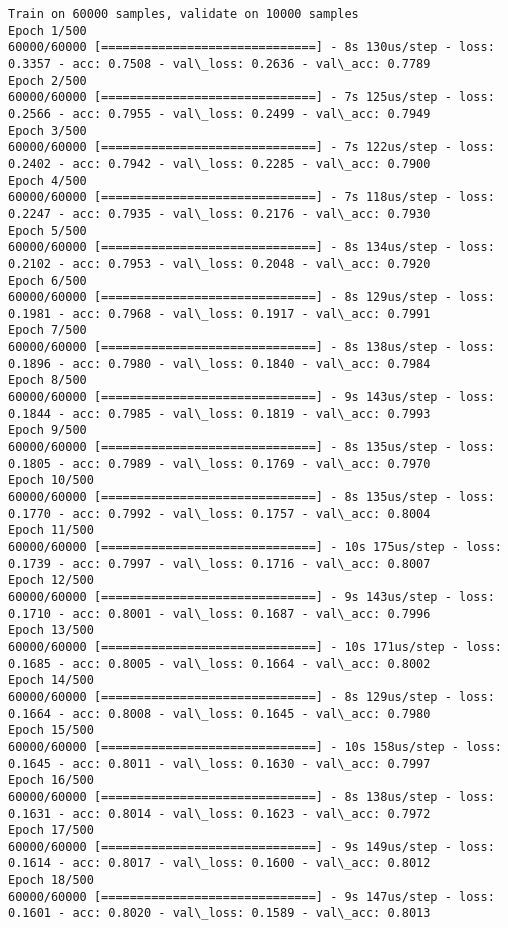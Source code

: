 \documentclass[11pt]{article}
\begin{document}
    \begin{Verbatim}[commandchars=\\\{\}]
Train on 60000 samples, validate on 10000 samples
Epoch 1/500
60000/60000 [==============================] - 8s 130us/step - loss: 0.3357 - acc: 0.7508 - val\_loss: 0.2636 - val\_acc: 0.7789
Epoch 2/500
60000/60000 [==============================] - 7s 125us/step - loss: 0.2566 - acc: 0.7955 - val\_loss: 0.2499 - val\_acc: 0.7949
Epoch 3/500
60000/60000 [==============================] - 7s 122us/step - loss: 0.2402 - acc: 0.7942 - val\_loss: 0.2285 - val\_acc: 0.7900
Epoch 4/500
60000/60000 [==============================] - 7s 118us/step - loss: 0.2247 - acc: 0.7935 - val\_loss: 0.2176 - val\_acc: 0.7930
Epoch 5/500
60000/60000 [==============================] - 8s 134us/step - loss: 0.2102 - acc: 0.7953 - val\_loss: 0.2048 - val\_acc: 0.7920
Epoch 6/500
60000/60000 [==============================] - 8s 129us/step - loss: 0.1981 - acc: 0.7968 - val\_loss: 0.1917 - val\_acc: 0.7991
Epoch 7/500
60000/60000 [==============================] - 8s 138us/step - loss: 0.1896 - acc: 0.7980 - val\_loss: 0.1840 - val\_acc: 0.7984
Epoch 8/500
60000/60000 [==============================] - 9s 143us/step - loss: 0.1844 - acc: 0.7985 - val\_loss: 0.1819 - val\_acc: 0.7993
Epoch 9/500
60000/60000 [==============================] - 8s 135us/step - loss: 0.1805 - acc: 0.7989 - val\_loss: 0.1769 - val\_acc: 0.7970
Epoch 10/500
60000/60000 [==============================] - 8s 135us/step - loss: 0.1770 - acc: 0.7992 - val\_loss: 0.1757 - val\_acc: 0.8004
Epoch 11/500
60000/60000 [==============================] - 10s 175us/step - loss: 0.1739 - acc: 0.7997 - val\_loss: 0.1716 - val\_acc: 0.8007
Epoch 12/500
60000/60000 [==============================] - 9s 143us/step - loss: 0.1710 - acc: 0.8001 - val\_loss: 0.1687 - val\_acc: 0.7996
Epoch 13/500
60000/60000 [==============================] - 10s 171us/step - loss: 0.1685 - acc: 0.8005 - val\_loss: 0.1664 - val\_acc: 0.8002
Epoch 14/500
60000/60000 [==============================] - 8s 129us/step - loss: 0.1664 - acc: 0.8008 - val\_loss: 0.1645 - val\_acc: 0.7980
Epoch 15/500
60000/60000 [==============================] - 10s 158us/step - loss: 0.1645 - acc: 0.8011 - val\_loss: 0.1630 - val\_acc: 0.7997
Epoch 16/500
60000/60000 [==============================] - 8s 138us/step - loss: 0.1631 - acc: 0.8014 - val\_loss: 0.1623 - val\_acc: 0.7972
Epoch 17/500
60000/60000 [==============================] - 9s 149us/step - loss: 0.1614 - acc: 0.8017 - val\_loss: 0.1600 - val\_acc: 0.8012
Epoch 18/500
60000/60000 [==============================] - 9s 147us/step - loss: 0.1601 - acc: 0.8020 - val\_loss: 0.1589 - val\_acc: 0.8013

\end{Verbatim}
\end{document}

